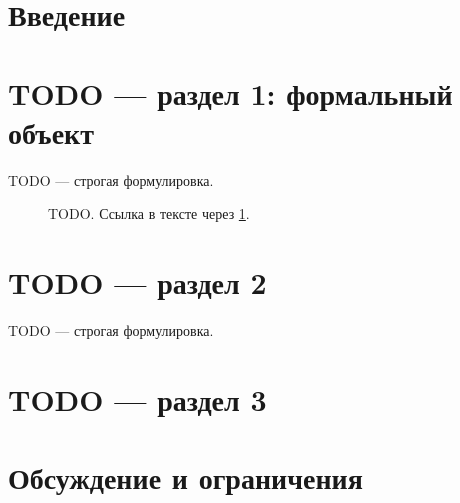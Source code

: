 \documentclass[11pt,a4paper]{article}
\begin{document}
\begin{abstract}
\noindent Здесь мы впервые показываем, что TODO --- не <<бытовая>>, а строгая
TODO-закономерность. Далее: проблема $\to$ метод $\to$ результаты $\to$ ограничения.

\medskip
\noindent\textbf{Ключевые слова:} TODO, TODO, лженаука
\end{abstract}

\section{Введение}

\section{TODO — раздел 1: формальный объект}

\begin{definition}
TODO — строгая формулировка.
\end{definition}

\begin{figure}[htbp]
\centering
\caption{TODO. Ссылка в тексте через \ref{fig:todo1}.}
\label{fig:todo1}
\end{figure}

\section{TODO — раздел 2}
\begin{theorem}
TODO — строгая формулировка.
\end{theorem}

\section{TODO — раздел 3}

\section{Обсуждение и ограничения}
\end{document}
